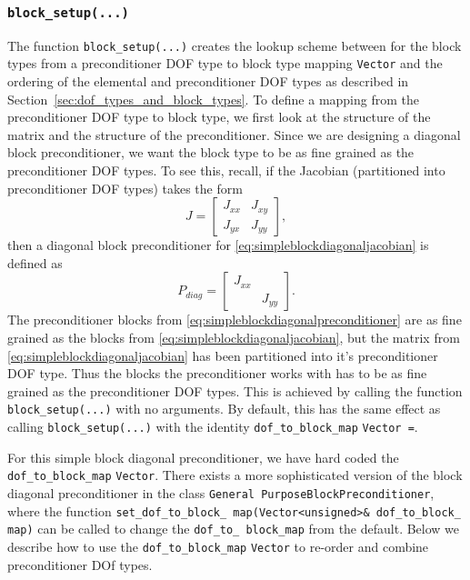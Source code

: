 \subsubsection{\texttt{block\_setup(...)}\label{sec:block_setup}}
The function \texttt{block\_\allowbreak setup(...)} creates the lookup scheme
between for the block types from a preconditioner DOF type to block type
mapping \texttt{Vector} and the ordering of the elemental and preconditioner
DOF types as described in Section~\ref{sec:dof_types_and_block_types}. To
define a mapping from the preconditioner DOF type to block type, we first look
at the structure of the matrix and the structure of the preconditioner. Since
we are designing a diagonal block preconditioner, we want the block type to be
as fine grained as the preconditioner DOF types. To see this, recall, if the
Jacobian (partitioned into preconditioner DOF types) takes the form 
\begin{equation}
J =
\begin{bmatrix}
J_{xx}&J_{xy} \\
J_{yx}&J_{yy}
\end{bmatrix},
\label{eq:simpleblockdiagonaljacobian}
\end{equation}
then a diagonal block preconditioner for \eqref{eq:simpleblockdiagonaljacobian}
is defined as
\begin{equation}
P_{diag} =
\begin{bmatrix}
J_{xx}& \\
      &J_{yy}
\end{bmatrix}.
\label{eq:simpleblockdiagonalpreconditioner}
\end{equation}
The preconditioner blocks from \eqref{eq:simpleblockdiagonalpreconditioner} are
as fine grained as the blocks from \eqref{eq:simpleblockdiagonaljacobian}, but
the matrix from \eqref{eq:simpleblockdiagonaljacobian} has been partitioned
into it's preconditioner DOF type. Thus the blocks the preconditioner works
with has to be as fine grained as the preconditioner DOF types. This is achieved
by calling the function \texttt{block\_\allowbreak setup(...)} with no
arguments. By default, this has the same effect as calling
\texttt{block\_\allowbreak setup(...)} with the identity
\texttt{dof\_\allowbreak to\_\allowbreak block\_\allowbreak map} \texttt{Vector
  \allowbreak =\allowbreak [0 1]}.


For this simple block diagonal preconditioner, we have hard coded the
\texttt{dof\_\allowbreak to\_\allowbreak block\_\allowbreak map}
\texttt{Vector}. There exists a more sophisticated version of the block
diagonal preconditioner in the class \texttt{General\allowbreak
  Purpose\allowbreak Block\allowbreak Preconditioner}, where the function
\texttt{set\_\allowbreak dof\_\allowbreak to\_\allowbreak block\_\allowbreak
  map(Vector<unsigned>\& dof\_\allowbreak to\_\allowbreak block\_\allowbreak
  map)} can be called to change the \texttt{dof\_\allowbreak to\_\allowbreak
  block\_\allowbreak map} from the default. Below we describe how to use the \texttt{dof\_\allowbreak to\_\allowbreak block\_\allowbreak map}
\texttt{Vector} to re-order and combine preconditioner DOf types.

